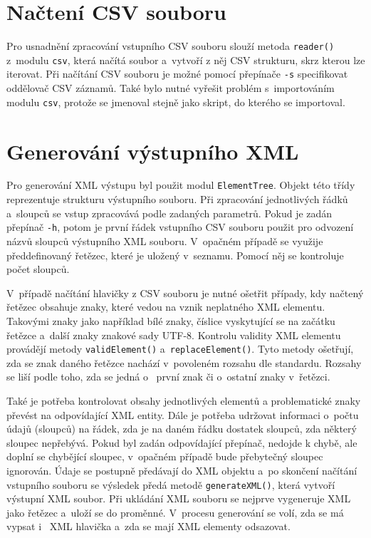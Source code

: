 \documentclass[10pt,a4paper,final]{article}
\begin{document}
  \section{Načtení CSV souboru} \label{nacitanie-suboru}

Pro usnadnění zpracování vstupního CSV souboru slouží metoda \texttt{reader()} z~modulu \texttt{csv}, která načítá soubor a~vytvoří z něj CSV strukturu, skrz kterou lze iterovat. Při načítání CSV souboru je možné pomocí přepínače \texttt{-s} specifikovat oddělovač CSV záznamů. 
Také bylo nutné vyřešit problém s~importováním modulu \texttt{csv}, protože se jmenoval stejně jako skript, do kterého se importoval.

  \section{Generování výstupního XML} \label{generovanie-xml}

Pro generování XML výstupu byl použit modul \texttt{ElementTree}. Objekt této třídy reprezentuje strukturu výstupního souboru. Při zpracování jednotlivých řádků a~sloupců se vstup zpracovává podle zadaných parametrů. Pokud je zadán přepínač \texttt{-h}, potom je první řádek vstupního CSV souboru použit pro odvození názvů sloupců výstupního XML souboru. V~opačném případě se využije předdefinovaný řetězec, které je uložený v~seznamu. Pomocí něj se kontroluje počet sloupců.  

V~případě načítání hlavičky z CSV souboru je nutné ošetřit případy, kdy načtený řetězec obsahuje znaky, které vedou na vznik neplatného XML elementu. Takovými znaky jako například bílé znaky, číslice vyskytující se na začátku řetězce a~další znaky znakové sady UTF-8. Kontrolu validity XML elementu provádějí metody \texttt{validElement()} a~\texttt{replaceElement()}. Tyto metody ošetřují, zda se znak daného řetězce nachází v~povoleném rozsahu dle standardu. Rozsahy se liší podle toho, zda se jedná o~ první znak či o~ostatní znaky v~řetězci. 

Také je potřeba kontrolovat obsahy jednotlivých elementů a problematické znaky převést na odpovídající XML entity. Dále je potřeba udržovat informaci o~počtu údajů (sloupců) na řádek, zda je na daném řádku dostatek sloupců, zda některý sloupec nepřebývá. Pokud byl zadán odpovídající přepínač, nedojde k chybě, ale doplní se chybějící sloupec, v~opačném případě bude přebytečný sloupec ignorován. Údaje se postupně předávají do XML objektu a~po skončení načítání vstupního souboru se výsledek předá metodě \texttt{generateXML()}, která vytvoří výstupní XML soubor. Při ukládání XML souboru se nejprve vygeneruje XML jako řetězec a~uloží se do proměnné. V~procesu generování se volí, zda se má vypsat i~ XML hlavička a~zda se mají XML elementy odsazovat.     
   
\end{document}
